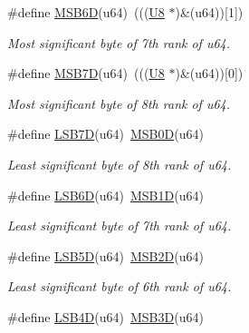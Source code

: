 \begin{DoxyCompactItemize}
\#define \mbox{\hyperlink{group__group__sam0__utils_gacb8062d046ca06f5c28c9a015997494b}{M\+S\+B6D}}(u64)~(((\mbox{\hyperlink{group__group__sam0__utils_gaa63ef7b996d5487ce35a5a66601f3e73}{U8}}  $\ast$)\&(u64))\mbox{[}1\mbox{]})
\begin{DoxyCompactList}\small\item\em Most significant byte of 7th rank of {\itshape u64}. \end{DoxyCompactList}\item 
\#define \mbox{\hyperlink{group__group__sam0__utils_ga0cbce69964fa2dd7bf05911d0b99b014}{M\+S\+B7D}}(u64)~(((\mbox{\hyperlink{group__group__sam0__utils_gaa63ef7b996d5487ce35a5a66601f3e73}{U8}}  $\ast$)\&(u64))\mbox{[}0\mbox{]})
\begin{DoxyCompactList}\small\item\em Most significant byte of 8th rank of {\itshape u64}. \end{DoxyCompactList}\item 
\#define \mbox{\hyperlink{group__group__sam0__utils_ga79fb849e13082fdd4adb02debbad7f1a}{L\+S\+B7D}}(u64)~\mbox{\hyperlink{group__group__sam0__utils_ga5f24ecf381776ee415991a545a05e4c7}{M\+S\+B0D}}(u64)
\begin{DoxyCompactList}\small\item\em Least significant byte of 8th rank of {\itshape u64}. \end{DoxyCompactList}\item 
\#define \mbox{\hyperlink{group__group__sam0__utils_gab90afefaf3b5cb2507ab3c496d8f643c}{L\+S\+B6D}}(u64)~\mbox{\hyperlink{group__group__sam0__utils_ga97a0ab6790df95cb4d8021d8850487f8}{M\+S\+B1D}}(u64)
\begin{DoxyCompactList}\small\item\em Least significant byte of 7th rank of {\itshape u64}. \end{DoxyCompactList}\item 
\#define \mbox{\hyperlink{group__group__sam0__utils_gac379acb246797736332fa1b8ae481b34}{L\+S\+B5D}}(u64)~\mbox{\hyperlink{group__group__sam0__utils_gad4ceacba543e7b8617ca4bd075abb146}{M\+S\+B2D}}(u64)
\begin{DoxyCompactList}\small\item\em Least significant byte of 6th rank of {\itshape u64}. \end{DoxyCompactList}\item 
\#define \mbox{\hyperlink{group__group__sam0__utils_gaab745f30b9b841f9ccd9ace0a5a1a9e5}{L\+S\+B4D}}(u64)~\mbox{\hyperlink{group__group__sam0__utils_gaf7972d3282ec9ecb97afa34e848ede2c}{M\+S\+B3D}}(u64)

\end{DoxyCompactItemize}
